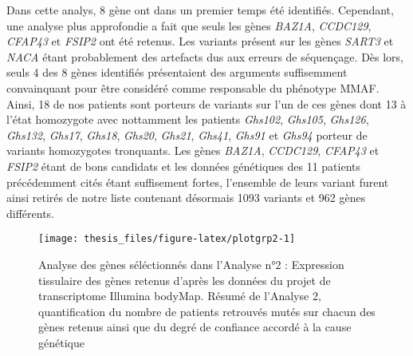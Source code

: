 \documentclass[12pt,twoside]{reedthesis}
\theoremstyle{definition}
\theoremstyle{definition}
\theoremstyle{remark}
\begin{document}
  Dans cette analys, 8 gène ont dans un premier temps été identifiés.
  Cependant, une analyse plus approfondie a fait que seuls les gènes
  \emph{BAZ1A}, \emph{CCDC129}, \emph{CFAP43} et \emph{FSIP2} ont été
  retenus. Les variants présent sur les gènes \emph{SART3} et \emph{NACA}
  étant probablement des artefacts dus aux erreurs de séquençage. Dès
  lors, seuls 4 des 8 gènes identifiés présentaient des arguments
  suffisemment convainquant pour être considéré comme responsable du
  phénotype MMAF. Ainsi, 18 de nos patients sont porteurs de variants sur
  l'un de ces gènes dont 13 à l'état homozygote avec nottamment les
  patients \emph{Ghs102}, \emph{Ghs105}, \emph{Ghs126}, \emph{Ghs132},
  \emph{Ghs17}, \emph{Ghs18}, \emph{Ghs20}, \emph{Ghs21}, \emph{Ghs41},
  \emph{Ghs91} et \emph{Ghs94} porteur de variants homozygotes tronquants.
  Les gènes \emph{BAZ1A}, \emph{CCDC129}, \emph{CFAP43} et \emph{FSIP2}
  étant de bons candidats et les données génétiques des 11 patients
  précédemment cités étant suffisement fortes, l'ensemble de leurs variant
  furent ainsi retirés de notre liste contenant désormais 1093 variants et
  962 gènes différents.
  
  \newpage  
  
  \begin{figure}
  
  {\centering \texttt{[image: thesis\_files/figure-latex/plotgrp2-1]} 
  
  }
  
  \caption[Analyse des gènes séléctionnés dans l'Analyse n°2]{Analyse des gènes séléctionnés dans l'Analyse n°2 : Expression tissulaire des gènes retenus d'après les données du projet de transcriptome Illumina bodyMap. Résumé de l'Analyse 2, quantification du nombre de patients retrouvés mutés sur chacun des gènes retenus ainsi que du degré de confiance accordé à la cause génétique}\label{fig:plotgrp2}
  \end{figure}
  
  \newpage  
  
\end{document}
